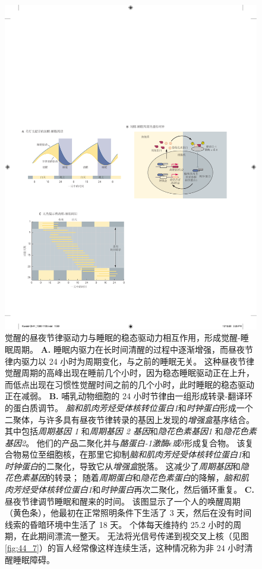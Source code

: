 \begin{figure}[htbp]
	\centering
	\includegraphics[width=1.0\linewidth]{chap44/fig_44_6}
	\caption{觉醒的昼夜节律驱动力与睡眠的稳态驱动力相互作用，形成觉醒-睡眠周期。
		\textbf{A.} 睡眠内驱力在长时间清醒的过程中逐渐增强，而昼夜节律内驱力以 24 小时为周期变化，与之前的睡眠无关。
		这种昼夜节律觉醒周期的高峰出现在睡前几个小时，因为稳态睡眠驱动正在上升，而低点出现在习惯性觉醒时间之前的几个小时，此时睡眠的稳态驱动正在减弱。
		\textbf{B.} 哺乳动物细胞的 24 小时节律由一组形成转录-翻译环的蛋白质调节。
		\textit{脑和肌肉芳烃受体核转位蛋白1}和\textit{时钟蛋白}形成一个二聚体，与许多具有昼夜节律转录的基因上发现的\textit{增强盒}基序结合。
		其中包括\textit{周期基因 1} 和\textit{周期基因 2 基因}和\textit{隐花色素基因1} 和\textit{隐花色素基因2}。
		他们的产品二聚化并与\textit{酪蛋白-1激酶$\epsilon$或$\delta$}形成复合物。
		该复合物易位至细胞核，在那里它抑制\textit{脑和肌肉芳烃受体核转位蛋白1}和\textit{时钟蛋白}的二聚化，导致它从\textit{增强盒}脱落。
		这减少了\textit{周期基因}和\textit{隐花色素基因}的转录；
		随着\textit{周期蛋白}和\textit{隐花色素蛋白}的降解，\textit{脑和肌肉芳烃受体核转位蛋白1}和\textit{时钟蛋白}再次二聚化，然后循环重复。
		\textbf{C.} 昼夜节律调节睡眠和醒来的时间。
		该图显示了一个人的唤醒周期（黄色条），他最初在正常照明条件下生活了 3 天，然后在没有时间线索的昏暗环境中生活了 18 天。
		个体每天维持约 25.2 小时的周期，在此期间漂流一整天。
		无法将光信号传递到视交叉上核（见图 \ref{fig:44_7}）的盲人经常像这样连续生活，这种情况称为非 24 小时清醒睡眠障碍。}
	\label{fig:44_6}
\end{figure}


